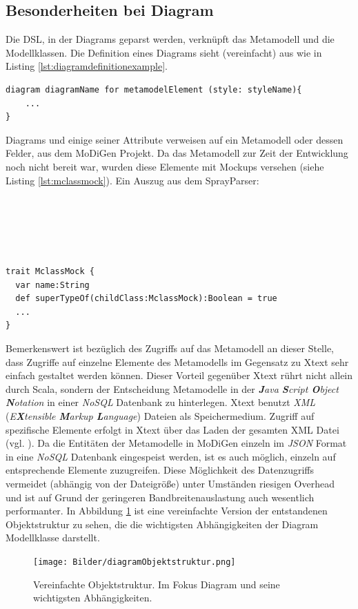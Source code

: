 \subsection{Besonderheiten bei Diagram}
Die DSL, in der Diagrams geparst werden, verknüpft das Metamodell und die Modellklassen. Die Definition eines Diagrams sieht (vereinfacht) aus wie in Listing \ref{lst:diagramdefinitionexample}.
\begin{lstlisting}[style=spray, caption = {Beispielhafte Diagram Definition (vereinfacht)}, label = {lst:diagramdefinitionexample}]
diagram diagramName for metamodelElement (style: styleName){
	...
}
\end{lstlisting}Diagrams und einige seiner Attribute verweisen auf ein Metamodell oder dessen Felder, aus dem MoDiGen Projekt.
Da das Metamodell zur Zeit der Entwicklung noch nicht bereit war, wurden diese Elemente mit Mockups versehen (siehe Listing \ref{lst:mclassmock}).
Ein Auszug aus dem SprayParser:\\\\\\\\\\\\
\begin{lstlisting}[style=scala, caption = {Auszug aus Code MclassMock über dass eigentliche MClass Elemente gemockt werden}, label = {lst:mclassmock}]
trait MclassMock {
  var name:String
  def superTypeOf(childClass:MclassMock):Boolean = true
  ...
}
\end{lstlisting}Bemerkenswert ist bezüglich des Zugriffs auf das Metamodell an dieser Stelle, dass Zugriffe auf einzelne Elemente des Metamodells im Gegensatz zu Xtext sehr einfach gestaltet werden können. Dieser Vorteil gegenüber Xtext rührt nicht allein durch Scala, sondern der Entscheidung Metamodelle in der \textit{\textbf{J}ava \textbf{S}cript \textbf{O}bject \textbf{N}otation} in einer \textit{NoSQL} Datenbank zu hinterlegen. Xtext benutzt \textit{XML} (\textit{E\textbf{X}tensible \textbf{M}arkup \textbf{L}anguage}) Dateien als Speichermedium. Zugriff auf spezifische Elemente erfolgt in Xtext über das Laden der gesamten XML Datei (vgl. ). Da die Entitäten der Metamodelle in MoDiGen einzeln im \textit{JSON} Format in eine \textit{NoSQL} Datenbank eingespeist werden, ist es auch möglich, einzeln auf entsprechende Elemente zuzugreifen. Diese Möglichkeit des Datenzugriffs vermeidet (abhängig von der Dateigröße) unter Umständen riesigen Overhead und ist auf Grund der geringeren Bandbreitenauslastung auch wesentlich performanter. In Abbildung \ref{objectstructureDiagram} ist eine vereinfachte Version der entstandenen Objektstruktur zu sehen, die die wichtigsten Abhängigkeiten der Diagram Modellklasse darstellt.
\begin{figure}[H]
\begin{center}
\texttt{[image: Bilder/diagramObjektstruktur.png]}
\caption{Vereinfachte Objektstruktur. Im Fokus Diagram und seine wichtigsten Abhängigkeiten.}
\label{objectstructureDiagram}
\end{center}
\end{figure}
